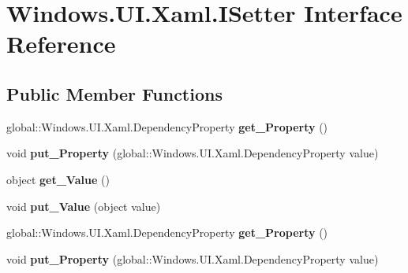 \hypertarget{interface_windows_1_1_u_i_1_1_xaml_1_1_i_setter}{}\section{Windows.\+U\+I.\+Xaml.\+I\+Setter Interface Reference}
\label{interface_windows_1_1_u_i_1_1_xaml_1_1_i_setter}
\subsection*{Public Member Functions}
\begin{DoxyCompactItemize}
\item 
\mbox{\label{interface_windows_1_1_u_i_1_1_xaml_1_1_i_setter_a3caf5fdfe02e38278e49afff4712f70c}} 
global\+::\+Windows.\+U\+I.\+Xaml.\+Dependency\+Property {\bfseries get\+\_\+\+Property} ()
\item 
\mbox{\label{interface_windows_1_1_u_i_1_1_xaml_1_1_i_setter_ab28bb64021366fee0d6ff823631c77ba}} 
void {\bfseries put\+\_\+\+Property} (global\+::\+Windows.\+U\+I.\+Xaml.\+Dependency\+Property value)
\item 
\mbox{\label{interface_windows_1_1_u_i_1_1_xaml_1_1_i_setter_a6f3c52ea80a2e55872c6f70db27a650d}} 
object {\bfseries get\+\_\+\+Value} ()
\item 
\mbox{\label{interface_windows_1_1_u_i_1_1_xaml_1_1_i_setter_a222ce9a11d2ca442e2176a98682d4ff0}} 
void {\bfseries put\+\_\+\+Value} (object value)
\item 
\mbox{\label{interface_windows_1_1_u_i_1_1_xaml_1_1_i_setter_a3caf5fdfe02e38278e49afff4712f70c}} 
global\+::\+Windows.\+U\+I.\+Xaml.\+Dependency\+Property {\bfseries get\+\_\+\+Property} ()
\item 
\mbox{\label{interface_windows_1_1_u_i_1_1_xaml_1_1_i_setter_ab28bb64021366fee0d6ff823631c77ba}} 
void {\bfseries put\+\_\+\+Property} (global\+::\+Windows.\+U\+I.\+Xaml.\+Dependency\+Property value)

\end{DoxyCompactItemize}
